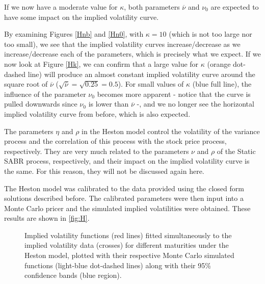 If we now have a moderate value for $\kappa$, both parameters $\overline{\nu}$ and $\nu_0$ are expected to have some impact on the implied volatility curve.

By examining Figures \autoref{Hnb} and \autoref{Hn0}, with $\kappa=10$ (which is not too large nor too small), we see that the implied volatility curves increase/decrease as we increase/decrease each of the parameters, which is precisely what we expect.
If we now look at Figure \autoref{Hk}, we can confirm that a large value for $\kappa$ (orange dot-dashed line) will produce an almost constant implied volatility curve around the square root of $\overline{\nu}$ ($\sqrt{\overline{\nu}}=\sqrt{0.25}=0.5$).
For small values of $\kappa$ (blue full line), the influence of the parameter $\nu_0$ becomes more apparent - notice that the curve is pulled downwards since $\nu_0$ is lower than $\overline{\nu}$ -, and we no longer see the horizontal implied volatility curve from before, which is also expected.

The parameters $\eta$ and $\rho$ in the Heston model control the volatility of the variance process and the correlation of this process with the stock price process, respectively. They are very much related to the parameters $\nu$ and $\rho$ of the Static SABR process, respectively, and their impact on the implied volatility curve is the same. For this reason, they will not be discussed again here.


The Heston model was calibrated to the data provided using the closed form solutions described before. The calibrated parameters were then input into a Monte Carlo pricer and the simulated implied volatilities were obtained. These results are shown in \autoref{fig:H}.

\vspace{\fill}
\newpage

\begin{figure}[H]
  \begin{subfigmatrix}{2}
  \end{subfigmatrix}
  \caption[Implied volatility functions fitted simultaneously to the implied volatility data for different maturities under the Heston model, plotted with their respective Monte Carlo simulated functions along with their 95\% confidence bands.]{Implied volatility functions (red lines) fitted simultaneously to the implied volatility data (crosses) for different maturities under the Heston model, plotted with their respective Monte Carlo simulated functions (light-blue dot-dashed lines) along with their 95\% confidence bands (blue region).}
  \label{fig:H}
\end{figure}


